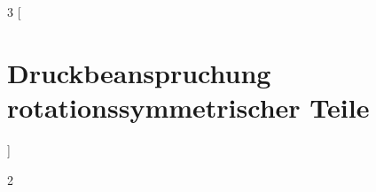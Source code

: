 \documentclass[9pt,fleqn,article,ngerman]{memoir}
\numberwithin{equation}{section}
\begin{document}
\begin{multicols*}{3}
	[\chapter{Druckbeanspruchung rotationssymmetrischer Teile}] %
\end{multicols*}

\appendix
\begin{multicols*}{2}
	\renewcommand*\thesection{\thechapter.\arabic{section}}
\end{multicols*}
\end{document}
